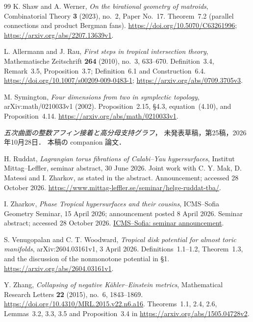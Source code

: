 \begin{thebibliography}{99}
K. Shaw and A. Werner,
\emph{On the birational geometry of matroids},
Combinatorial Theory \textbf{3} (2023), no.~2, Paper No.~17.
Theorem~7.2 (parallel connections and product Bergman fans).
\url{https://doi.org/10.5070/C63261996};
\url{https://arxiv.org/abs/2207.13639v1}.

L. Allermann and J. Rau,
\emph{First steps in tropical intersection theory},
Mathematische Zeitschrift \textbf{264} (2010), no.~3, 633--670.
Definition~3.4, Remark~3.5, Proposition~3.7;
Definition~6.1 and Construction~6.4.
\url{https://doi.org/10.1007/s00209-009-0483-1};
\url{https://arxiv.org/abs/0709.3705v3}.

M. Symington,
\emph{Four dimensions from two in symplectic topology},
arXiv:math/0210033v1 (2002).
Proposition~2.15, \S4.3, equation~(4.10), and Proposition~4.14.
\url{https://arxiv.org/abs/math/0210033v1}.

\emph{五次曲面の整数アフィン接着と高分母支持グラフ}，
未発表草稿，第25稿，2026年10月28日．
本稿の companion 論文．


H. Ruddat,
\emph{Lagrangian torus fibrations of Calabi--Yau hypersurfaces},
Institut Mittag--Leffler, seminar abstract, 30 June 2026.
Joint work with C. Y. Mak, D. Matessi and I. Zharkov, as stated in the abstract.
Announcement; accessed 28 October 2026.
\url{https://www.mittag-leffler.se/seminar/helge-ruddat-tba/}.

I. Zharkov,
\emph{Phase Tropical hypersurfaces and their cousins},
ICMS--Sofia Geometry Seminar, 15 April 2026; announcement posted 8 April 2026.
Seminar abstract; accessed 28 October 2026.
\href{https://icms.bg/phase-tropical-hypersurfaces-and-their-cousins-geometry-seminar-talk-by-ilia-zharkov/}{ICMS--Sofia: seminar announcement}.


S. Venugopalan and C. T. Woodward,
\emph{Tropical disk potential for almost toric manifolds},
arXiv:2604.03161v1, 3 April 2026.
Definitions~1.1--1.2, Theorem~1.3, and the discussion of the nonmonotone potential in \S1.
\url{https://arxiv.org/abs/2604.03161v1}.

Y. Zhang,
\emph{Collapsing of negative Kähler--Einstein metrics},
Mathematical Research Letters \textbf{22} (2015), no.~6, 1843--1869.
\url{https://doi.org/10.4310/MRL.2015.v22.n6.a16}.
Theorems~1.1, 2.4, 2.6, Lemmas~3.2, 3.3, 3.5 and Proposition~3.4
in \url{https://arxiv.org/abs/1505.04728v2}.


\end{thebibliography}
